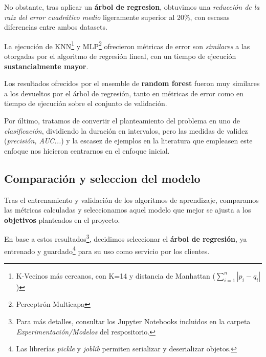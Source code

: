 No obstante, tras aplicar un \textbf{árbol de regresion},  obtuvimos una \textit{reducción de la raíz del error cuadrático medio} ligeramente superior al 20\%, con escasas diferencias entre ambos datasets.


La ejecución de KNN\footnote{K-Vecinos más cercanos, con K=14 y distancia de Manhattan (\(\sum_{i=1}^{n} |p_{i} - q_{i}|\))} y MLP\footnote{Perceptrón Multicapa} ofrecieron métricas de error son \textit{similares} a las otorgadas por el algoritmo de regresión lineal, con un tiempo de ejecución \textbf{sustancialmente mayor}.

Los resultados ofrecidos por el ensemble de \textbf{random forest} fueron muy similares a los devueltos por el árbol de regresión, tanto en métricas de error como en tiempo de ejecución sobre el conjunto de validación.

Por último, tratamos de convertir el planteamiento del problema en uno de \textit{clasificación}, dividiendo la duración en intervalos, pero las medidas de validez (\textit{precisión, AUC...}) y la escasez de ejemplos en la literatura que empleasen este enfoque nos hicieron centrarnos en el enfoque inicial.


\subsection{Comparación y seleccion del modelo}

Tras el entrenamiento y validación de los algoritmos de aprendizaje, comparamos las métricas calculadas y seleccionamos aquel modelo que mejor se ajusta a los \textbf{objetivos} planteados en el proyecto.


En base a estos resultados\footnote{Para más detalles, consultar los Jupyter Notebooks incluidos en la carpeta \textit{Experimentación/Modelos} del respositorio.}, decidimos seleccionar el \textbf{árbol de regresión}, ya entrenado y guardado\footnote{Las librerías \textit{pickle} y \textit{joblib} permiten serializar y deserializar objetos.} para su uso como servicio por los clientes.


